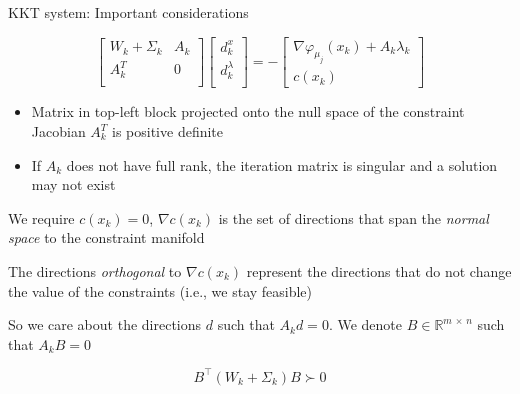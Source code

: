 \documentclass{beamer}
\begin{document}
\begin{frame}{KKT system: Important considerations}

  \begin{equation*}
    \begin{bmatrix}
      W_k + \Sigma_k & A_k \\
      A_k^T          & 0   \\
    \end{bmatrix}
    \begin{bmatrix}
      d_k^x       \\
      d_k^\lambda \\
    \end{bmatrix}
    =
    -
    \begin{bmatrix}
      \nabla \varphi_{\mu_j}(x_k) + A_k \lambda_k \\
      c(x_k)
    \end{bmatrix}
  \end{equation*}

  \begin{itemize}
    \item Matrix in top-left block projected onto the null space of the constraint Jacobian $A_k^T$ is positive definite
    \item If $A_k$ does not have full rank, the iteration matrix is singular and a solution may not exist
  \end{itemize}

  \pause
  \vfill

  We require $c(x_k) = 0$, $\nabla c(x_k) $ is the set of directions that span the \emph{normal space} to the constraint manifold

  The directions \emph{orthogonal} to $\nabla c(x_k)$ represent the directions that do not change the value of the constraints (i.e., we stay feasible)

  \pause
  So we care about the directions $d$ such that $A_k d = 0$. We denote $B \in \mathbb{R}^{m\,\times\,n}$ such that $A_k B = 0$

  \[
    B^\top (W_k + \Sigma_k) B \succ 0
  \]

\end{frame}
\end{document}
